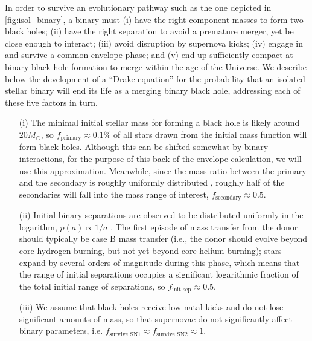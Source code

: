 \documentclass[iop,onecolumn]{revtex4}
\begin{document}
In order to survive an evolutionary pathway such as the one depicted in \autoref{fig:isol_binary}, a binary must (i) have the right component masses to form two black holes; (ii) have the right separation to avoid a premature merger, yet be close enough to interact; (iii) avoid disruption by supernova kicks; (iv) engage in and survive a common envelope phase; and (v) end up sufficiently compact at binary black hole formation to merge within the age of the Universe. We describe below the development of a ``Drake equation'' for the probability that an isolated stellar binary will end its life as a merging binary black hole, addressing each of these five factors in turn.

\begin{enumerate}
	\item[(i)] The minimal initial stellar mass for forming a black hole is likely around $20 M_\odot$, so $f_\textrm{primary} \approx 0.1\%$ of all stars drawn from the \citet{Kroupa:2002} initial mass function will form black holes. Although this can be shifted somewhat by binary interactions, for the purpose of this back-of-the-envelope calculation, we will use this approximation. Meanwhile, since the mass ratio between the primary and the secondary is roughly uniformly distributed \citep{Sana:2012}, roughly half of the secondaries will fall into the mass range of interest, $f_\textrm{secondary} \approx 0.5$.  

\item[(ii)] Initial binary  separations are observed to be distributed uniformly in the logarithm, $p(a) \propto 1/a$ \citep{Opik:1924}.  The first episode of mass transfer from the donor should typically be case B mass transfer (i.e., the donor should evolve beyond core hydrogen burning, but not yet beyond core helium burning); stars expand by several orders of magnitude during this phase, which means that the range of initial separations occupies a significant logarithmic fraction of the total initial range of separations, so $f_\textrm{init sep} \approx 0.5$.  

\item[(iii)]  We assume that black holes receive low natal kicks and do not lose significant amounts of mass, so that supernovae do not significantly affect binary parameters, i.e. $f_\textrm{survive SN1} \approx f_\textrm{survive SN2} \approx 1$.  


\end{enumerate}
\end{document}
